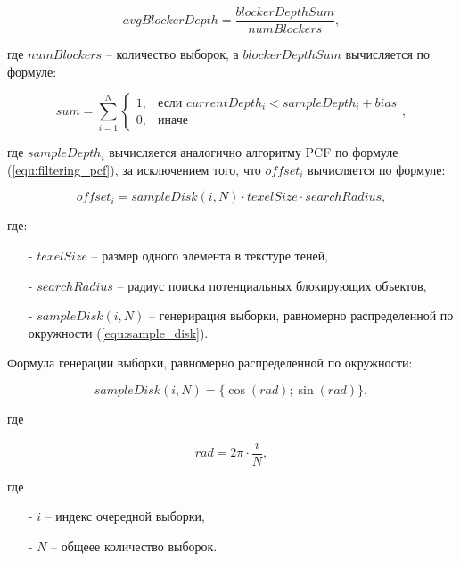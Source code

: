\begin{equation}
    \label{equ:search_blocker}
    avgBlockerDepth = \frac{blockerDepthSum}{numBlockers},
\end{equation}

\noindent где $numBlockers$ -- количество выборок,
а $blockerDepthSum$ вычисляется по формуле:

\begin{equation}
    \label{euq:blocker_depth_sum}
    sum = \sum_{i = 1}^{N}
    \begin{cases}
        1, & \text{если $currentDepth_i < sampleDepth_i + bias$} \\
        0, & \text{иначе}
    \end{cases},
\end{equation}

\noindent где $sampleDepth_i$ вычисляется аналогично алгоритму PCF по формуле (\ref{equ:filtering_pcf}),
за исключением того, что $offset_i$ вычисляется по формуле:

\begin{equation}
    \label{equ:offset_pcss}
    offset_i = sampleDisk(i, N) \cdot texelSize \cdot searchRadius,
\end{equation}

\noindent где:

\begin{itemize}
    \item[-] $texelSize$ -- размер одного элемента в текстуре теней,
    \item[-] $searchRadius$ -- радиус поиска потенциальных блокирующих объектов, 
    \item[-] $sampleDisk(i, N)$ -- генерирация выборки, равномерно распределенной по окружности (\ref{equ:sample_disk}).
\end{itemize}

Формула генерации выборки, равномерно распределенной по окружности:

\begin{equation}
    \label{equ:sample_disk}
    sampleDisk(i, N) = \{\cos(rad); \sin(rad)\},    
\end{equation}

\noindent где

\begin{equation*}
    rad = 2 \pi \cdot\frac{i}{N},
\end{equation*}

\noindent где

\begin{itemize}
    \item[-] $i$ -- индекс очередной выборки,
    \item[-] $N$ -- общеее количество выборок.
\end{itemize}

